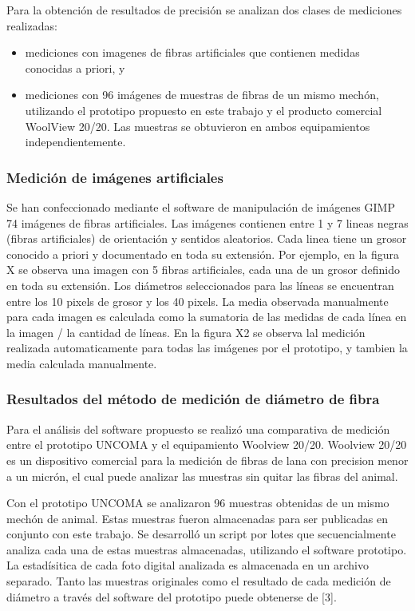 \documentclass[runningheads,a4paper]{llncs}
\begin{document}
Para la obtención de resultados de precisión se analizan dos clases de mediciones realizadas: 
\begin{itemize}
\item mediciones con imagenes de fibras artificiales que contienen medidas conocidas a priori, y
\item mediciones con 96 imágenes de muestras de fibras de un mismo mechón, utilizando el prototipo propuesto en este trabajo y el producto comercial WoolView 20/20. Las muestras se obtuvieron en ambos equipamientos independientemente.
\end{itemize}

\subsubsection{Medición de imágenes artificiales}

Se han confeccionado mediante el software de manipulación de imágenes GIMP 74 imágenes de fibras artificiales. Las imágenes contienen entre 1 y 7 lineas negras (fibras artificiales) de orientación  y sentidos aleatorios. Cada linea tiene un grosor conocido a priori y documentado en toda su extensión. Por ejemplo, en la figura X se observa una imagen con 5 fibras artificiales, cada una de un grosor definido en toda su extensión. Los diámetros seleccionados para las líneas se encuentran entre los 10 pixels de grosor y los 40 pixels. La media observada manualmente para cada imagen es calculada como la sumatoria de las medidas de cada línea en la imagen / la cantidad de líneas.
En la figura X2 se observa lal medición realizada automaticamente para todas las imágenes por el prototipo, y tambien la media calculada manualmente. 

\subsubsection{Resultados del método de medición de diámetro de fibra} 

Para el análisis del software propuesto se realizó una comparativa de medición entre el prototipo UNCOMA y el equipamiento Woolview 20/20. 
Woolview 20/20 es un dispositivo comercial para la medición de fibras de lana con precision menor a un micrón, el cual puede analizar las muestras sin quitar las fibras del animal. 

Con el prototipo UNCOMA se analizaron 96 muestras obtenidas de un mismo mechón de animal. Estas muestras fueron almacenadas para ser publicadas en conjunto con este trabajo. Se desarrolló un script por lotes que secuencialmente analiza cada una de estas muestras almacenadas, utilizando el software prototipo. La estadísitica de cada foto digital analizada es almacenada en un archivo separado. Tanto las muestras originales como el resultado de cada medición de diámetro a través del software del prototipo puede obtenerse de [3].
\end{document}
